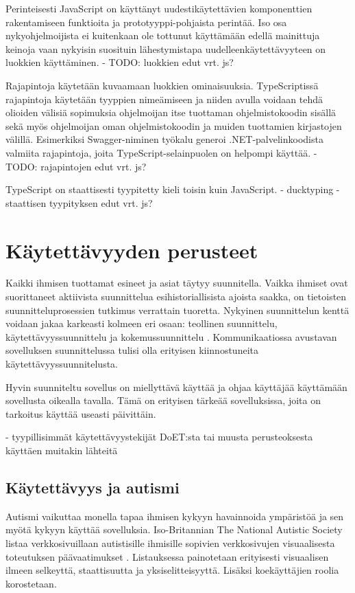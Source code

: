 \documentclass[utf8]{gradu3}
\begin{document}
Perinteisesti JavaScript on käyttänyt uudestikäytettävien komponenttien rakentamiseen funktioita ja prototyyppi-pohjaista perintää. Iso osa nykyohjelmoijista ei kuitenkaan ole tottunut käyttämään edellä mainittuja keinoja vaan nykyisin suosituin lähestymistapa uudelleenkäytettävyyteen on luokkien käyttäminen. \parencite[]{typescript-classes}
- TODO: luokkien edut vrt. js?

Rajapintoja käytetään kuvaamaan luokkien ominaisuuksia. TypeScriptissä rajapintoja käytetään tyyppien nimeämiseen ja niiden avulla voidaan tehdä olioiden välisiä sopimuksia ohjelmoijan itse tuottaman ohjelmistokoodin sisällä sekä myös ohjelmoijan oman ohjelmistokoodin ja muiden tuottamien kirjastojen välillä. \parencite[]{typescript-interfaces} Esimerkiksi Swagger-niminen työkalu generoi .NET-palvelinkoodista valmiita rajapintoja, joita TypeScript-selainpuolen on helpompi käyttää.
- TODO: rajapintojen edut vrt. js?

TypeScript on staattisesti tyypitetty kieli toisin kuin JavaScript.
- ducktyping
- staattisen tyypityksen edut vrt. js?

\section{Käytettävyyden perusteet}

Kaikki ihmisen tuottamat esineet ja asiat täytyy suunnitella. Vaikka ihmiset ovat suorittaneet aktiivista suunnittelua esihistoriallisista ajoista saakka, on tietoisten suunnitteluprosessien tutkimus verrattain tuoretta. Nykyinen suunnittelun kenttä voidaan jakaa karkeasti kolmeen eri osaan: teollinen suunnittelu, käytettävyyssuunnittelu ja kokemussuunnittelu \parencite[]{norman-doet}. Kommunikaatiossa avustavan sovelluksen suunnittelussa tulisi olla erityisen kiinnostuneita käytettävyyssuunnitelusta.

Hyvin suunniteltu sovellus on miellyttävä käyttää ja ohjaa käyttäjää käyttämään sovellusta oikealla tavalla. Tämä on erityisen tärkeää sovelluksissa, joita on tarkoitus käyttää useasti päivittäin.

- tyypillisimmät käytettävyystekijät DoET:sta tai muusta perusteoksesta käyttäen muitakin lähteitä

\subsection{Käytettävyys ja autismi}

Autismi vaikuttaa monella tapaa ihmisen kykyyn havainnoida ympäristöä ja sen myötä kykyyn käyttää sovelluksia. Iso-Britannian The National Autistic Society listaa verkkosivuillaan autistisille ihmisille sopivien verkkosivujen visuaalisesta toteutuksen päävaatimukset \parencite[]{autism-friendly-websites}. Listauksessa painotetaan erityisesti visuaalisen ilmeen selkeyttä, staattisuutta ja yksiselitteisyyttä. Lisäksi koekäyttäjien roolia korostetaan.
\end{document}
